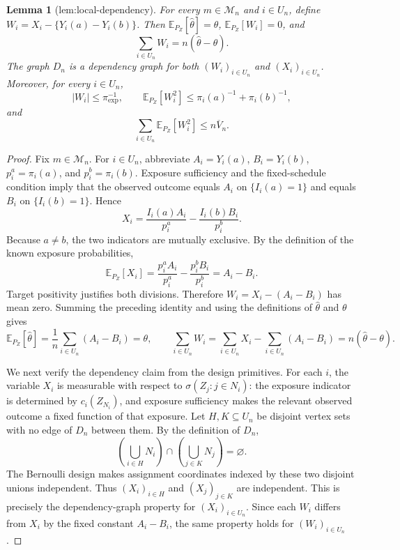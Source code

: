 \documentclass{article}
\newtheorem{lemma}{Lemma}
\begin{document}
\begin{lemma}[lem:local-dependency]\label{lem:local-dependency}
For every \(m\in\mathcal M_n\) and \(i\in U_n\), define \(W_i=X_i-\{Y_i(a)-Y_i(b)\}\). Then \(\mathbb E_{P_Z}[\widehat{\theta}]=\theta\), \(\mathbb E_{P_Z}[W_i]=0\), and \[\sum_{i\in U_n}W_i=n(\widehat{\theta}-\theta).\] The graph \(D_n\) is a dependency graph for both \((W_i)_{i\in U_n}\) and \((X_i)_{i\in U_n}\). Moreover, for every \(i\in U_n\), \[|W_i|\le\pi_{\exp}^{-1},\qquad \mathbb E_{P_Z}[W_i^2]\le\pi_i(a)^{-1}+\pi_i(b)^{-1},\] and \[\sum_{i\in U_n}\mathbb E_{P_Z}[W_i^2]\le n\overline V_n.\]
\end{lemma}
\begin{proof}
Fix \(m\in\mathcal M_n\). For \(i\in U_n\), abbreviate \(A_i=Y_i(a)\), \(B_i=Y_i(b)\), \(p_i^a=\pi_i(a)\), and \(p_i^b=\pi_i(b)\). Exposure sufficiency and the fixed-schedule condition imply that the observed outcome equals \(A_i\) on \(\{I_i(a)=1\}\) and equals \(B_i\) on \(\{I_i(b)=1\}\). Hence
\[
X_i=\frac{I_i(a)A_i}{p_i^a}-\frac{I_i(b)B_i}{p_i^b}.
\]
Because \(a\ne b\), the two indicators are mutually exclusive. By the definition of the known exposure probabilities,
\[
\mathbb E_{P_Z}[X_i]
=\frac{p_i^a A_i}{p_i^a}-\frac{p_i^b B_i}{p_i^b}
=A_i-B_i.
\]
Target positivity justifies both divisions. Therefore \(W_i=X_i-(A_i-B_i)\) has mean zero. Summing the preceding identity and using the definitions of \(\widehat\theta\) and \(\theta\) gives
\[
\mathbb E_{P_Z}[\widehat\theta]
=\frac1n\sum_{i\in U_n}(A_i-B_i)=\theta,
\qquad
\sum_{i\in U_n}W_i
=\sum_{i\in U_n}X_i-\sum_{i\in U_n}(A_i-B_i)
=n(\widehat\theta-\theta).
\]

We next verify the dependency claim from the design primitives. For each \(i\), the variable \(X_i\) is measurable with respect to \(\sigma(Z_j:j\in N_i)\): the exposure indicator is determined by \(c_i(Z_{N_i})\), and exposure sufficiency makes the relevant observed outcome a fixed function of that exposure. Let \(H,K\subseteq U_n\) be disjoint vertex sets with no edge of \(D_n\) between them. By the definition of \(D_n\),
\[
\left(\bigcup_{i\in H}N_i\right)\cap
\left(\bigcup_{j\in K}N_j\right)=\varnothing.
\]
The Bernoulli design makes assignment coordinates indexed by these two disjoint unions independent. Thus \((X_i)_{i\in H}\) and \((X_j)_{j\in K}\) are independent. This is precisely the dependency-graph property for \((X_i)_{i\in U_n}\). Since each \(W_i\) differs from \(X_i\) by the fixed constant \(A_i-B_i\), the same property holds for \((W_i)_{i\in U_n}\).


\end{proof}
\end{document}

